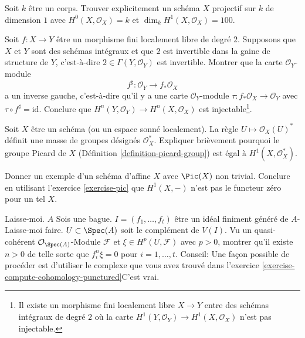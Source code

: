 \begin{exercise}
\label{exercise-find-curve-genus-one-hundred}
Soit $k$ être un corps. Trouver explicitement un schéma $X$ projectif sur
$k$ de dimension $1$ avec $H^0(X, \mathcal{O}_X) = k$
et $\dim_k H^1(X, \mathcal{O}_X) = 100$.
\end{exercise}

\begin{exercise}
\label{exercise-degree-2-cover}
Soit $f : X \to Y$ être un morphisme fini localement libre
de degré $2$. Supposons que $X$ et $Y$ sont des schémas intégraux et
que $2$ est invertible dans la gaine de structure de $Y$, c'est-à-dire $2
\in \Gamma(Y, \mathcal{O}_Y)$ est invertible. Montrer que la carte $\mathcal{O}_Y$-module
$$
f^\sharp : \mathcal{O}_Y \longrightarrow f_*\mathcal{O}_X
$$
a un inverse gauche, c'est-à-dire qu'il y a une
carte $\mathcal{O}_Y$-module $\tau : f_*\mathcal{O}_X \to
\mathcal{O}_Y$ avec $\tau \circ f^\sharp =
\text{id}$. Conclure que $H^n(Y, \mathcal{O}_Y) \to H^n(X, \mathcal{O}_X)$ est
injectable\footnote{Il existe un morphisme fini localement libre $X \to
Y$ entre des schémas intégraux de degré $2$ où
la carte $H^1(Y, \mathcal{O}_Y) \to H^1(X, \mathcal{O}_X)$ n'est pas injectable.}.
\end{exercise}

\begin{exercise}
\label{exercise-pic}
Soit $X$ être un schéma (ou un espace
sonné localement). La règle $U \mapsto \mathcal{O}_X(U)^*$ définit
une masse de groupes
désignés $\mathcal{O}_X^*$. Expliquer brièvement pourquoi le
groupe Picard de $X$ (Définition \ref{definition-picard-group})
est égal à $H^1(X, \mathcal{O}_X^*)$.
\end{exercise}

\begin{exercise}
\label{exercise-pic-nontrivial}
Donner un exemple d'un schéma d'affine $X$ avec $\Pic(X)$ non trivial.
Conclure en utilisant l'exercice \ref{exercise-pic} que $H^1(X, -)$ n'est pas le functeur
zéro pour un tel $X$.
\end{exercise}

\begin{exercise}
\label{exercise-kill-cohomology-complement}
Laisse-moi. $A$ Sois une bague. $I = (f_1, \ldots, f_t)$ être un idéal
finiment généré de $A$- Laisse-moi faire. $U \subset \Spec(A)$ soit le
complément de $V(I)$. Vu un quasi-cohérent $\mathcal{O}_{\Spec(A)}$-Module $\mathcal{F}$ et $\xi \in H^p(U,
\mathcal{F})$ avec $p > 0$, montrer qu'il existe $n > 0$ de
telle sorte que $f_i^n \xi = 0$ pour $i =
1, \ldots, t$. Conseil: Une façon possible de procéder est
d'utiliser le complexe que vous avez trouvé dans l'exercice \ref{exercise-compute-cohomology-punctured}C'est vrai.
\end{exercise}

